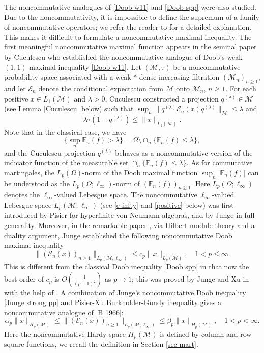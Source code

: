 \documentclass[11]{amsart}
\numberwithin{equation}{section}
\newcommand{\M}{\mathcal{M}}
\begin{document}
The noncommutative analogues of \eqref{Doob w11} and \eqref{Doob spp} were also studied. 
Due to the noncommutativity, it is impossible
to define the supremum of a family of noncommutative operators; we refer the reader to \cite[p.\,386]{JX2007} for a detailed explanation. This makes it difficult to formulate a noncommutative maximal inequality.
The first meaningful noncommutative maximal function appears in the seminal paper \cite{Cu1971} by Cuculescu who established the noncommutative analogue of Doob's weak $(1,1)$ maximal inequality \eqref{Doob w11}.
 Let $(\mathcal{M},\tau)$ be a noncommutative probability space associated with a weak-$\ast$ dense increasing filtration $(\mathcal{M}_n)_{n\geq1}$, and let $\mathcal{E}_n$ denote the  conditional expectation from $\mathcal{M}$ onto $\mathcal{M}_n$, $n\geq1$.
For each positive $x\in L_1(\mathcal{M})$ and $\lambda>0$, Cuculescu \cite{Cu1971} constructed a projection $q^{(\lambda)}\in \M$  (see Lemma \ref{Cuculescu} below)  such that $\sup_n\|q^{(\lambda)}\mathcal{E}_n(x)q^{(\lambda)}\|_{\M}\leq \lambda$ and
\begin{equation}\label{Nc weak 11}
\lambda\tau(1-q^{(\lambda)})\leq \|x\|_{L_1(\M)}.
\end{equation}
Note that in the classical case, we have
$$\{\sup_n\mathbb{E}_n(f)>\lambda\}=\Omega\setminus \cap_n\{\mathbb{E}_n(f)\leq \lambda\},$$
and the Cuculescu projection $q^{(\lambda)}$ behaves as a noncommutative version of the indicator function of the measurable set $\cap_n\{\mathbb{E}_n(f)\leq \lambda\}$.
As for commutative martingales, the $L_p(\Omega)$-norm of the Doob maximal function $\sup_n|\mathbb{E}_n(f)|$ can be understood as the $L_p(\Omega;\ell_{\infty})$-norm of $(\mathbb{E}_n(f))_{n\geq1}$. Here $L_p(\Omega;\ell_{\infty})$ denotes the $\ell_{\infty}$-valued Lebesgue space. The noncommutative $\ell_{\infty}$-valued Lebesgue space $L_p(\mathcal{M},\ell_{\infty})$ (see \eqref{e-infty} and \eqref{positive} below) was first introduced by Pisier \cite{Pi1998} for hyperfinite von Neumann algebras, and by Junge \cite{Ju2002} in full generality. Moreover, in the remarkable paper \cite{Ju2002}, via Hilbert module theory and a duality argument, Junge established the following noncommutative Doob maximal inequality
\begin{equation}\label{Junge strong pp}	\|(\mathcal{E}_n(x))_{n\geq1}\|_{L_{p}(\mathcal{M},\ell_{\infty})}\leq c_p\|x\|_{L_p(\mathcal{M})},\quad 1<p\leq \infty.
\end{equation}
This is different from the classical Doob inequality \eqref{Doob spp} in that now the best order of $c_p$ is $O(\frac{1}{(p-1)^2})$ as $p\to1$; this was proved by Junge and Xu in \cite[Theorem 8]{JX2005} with the help of  \cite{JX2007}. A combination of Junge's noncommutative Doob inequality \eqref{Junge strong pp} and Pisier-Xu Burkholder-Gundy inequality gives a  noncommutative analogue of \eqref{B 1966}: $$\alpha_p\|x\|_{H_p(\M)}\leq \|(\mathcal{E}_n(x))_{n\geq1}\|_{L_{p}(\mathcal{M},\ell_{\infty})}\leq \beta_p\|x\|_{H_p(\mathcal{M})},\quad 1<p< \infty.$$
Here the noncommutative Hardy space $H_p(\M)$ is defined by column and row square functions, we recall the definition in Section \ref{sec-mart}.
\end{document}
